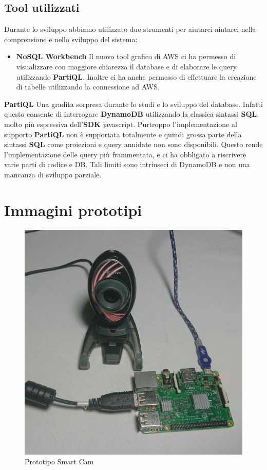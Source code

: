 \subsection{Tool utilizzati}
    Durante lo sviluppo abbiamo utilizzato due strumenti per aiutarci aiutarci nella comprensione e nello sviluppo del sistema:
    \begin{itemize}
        \item \textbf{NoSQL Workbench} Il nuovo tool grafico di AWS ci ha permesso di visualizzare con maggiore chiarezza il database e di elaborare le query utilizzando \textbf{PartiQL}.
        Inoltre ci ha anche permesso di effettuare la creazione di tabelle utilizzando la connessione ad AWS.
    \end{itemize}\textbf{PartiQL} Una gradita sorpresa durante lo studi e lo sviluppo del database. Infatti questo consente di interrogare \textbf{DynamoDB} utilizzando la classica sintassi \textbf{SQL}, molto più espressiva dell'\textbf{SDK} javascript.
    Purtroppo l'implementazione al supporto \textbf{PartiQL} non è supportata totalmente e quindi grossa parte della sintassi \textbf{SQL}
    come proiezioni e query annidate non sono disponibili.
    Questo rende l'implementazione delle query più frammentata, e ci ha obbligato a riscrivere varie parti di codice e DB.
    Tali limiti sono intrinseci di DynamoDB e non una mancanza di sviluppo parziale.
    
\section{Immagini prototipi}

        \begin{figure}[H]
            \caption{Prototipo Smart Cam}
            \label{fig:SmartCam}
            \centering
            \includegraphics[width=1\textwidth]{Images/SmartCam.jpeg}
        \end{figure}
        
